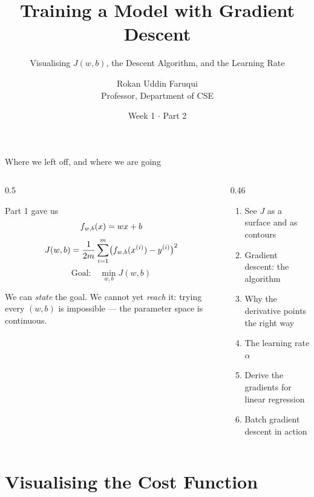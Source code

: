 \documentclass[aspectratio=169,11pt]{beamer}
\title[CSE 815 -- Week 1, Part 2]{Training a Model with Gradient Descent}
\subtitle{Visualising $J(w,b)$, the Descent Algorithm, and the Learning Rate}
\author{Rokan Uddin Faruqui\\ \small Professor, Department of CSE}
\institute{\small University of Chittagong \\ \texttt{rufaruqui@cu.ac.bd}}
\date[Week 1 / P 2]{ Week 1 $\cdot$ Part 2 }
\begin{document}
\begin{frame}
  \titlepage
\end{frame}

\begin{frame}{Where we left off, and where we are going}
  \begin{columns}[T,onlytextwidth]
    \begin{column}{0.5\textwidth}
      \begin{block}{Part 1 gave us}
        \[ f_{w,b}(x)=wx+b \]
        \[ J(w,b)=\frac{1}{2m}\sum_{i=1}^{m}\bigl(f_{w,b}(x^{(i)})-y^{(i)}\bigr)^2 \]
        \[ \text{Goal:}\quad \min_{w,b} J(w,b) \]
      \end{block}
      \small We can \emph{state} the goal. We cannot yet \emph{reach} it: trying
      every $(w,b)$ is impossible --- the parameter space is continuous.
    \end{column}
    \begin{column}{0.46\textwidth}
      \begin{keyidea}[Today]
        \small
        \begin{enumerate}
          \item See $J$ as a surface and as contours 
          \item Gradient descent: the algorithm 
          \item Why the derivative points the right way 
          \item The learning rate $\alpha$ 
          \item Derive the gradients for linear regression 
          \item Batch gradient descent in action 
        \end{enumerate}
      \end{keyidea}
    \end{column}
  \end{columns}
\end{frame}

\section{Visualising the Cost Function}
\end{document}
